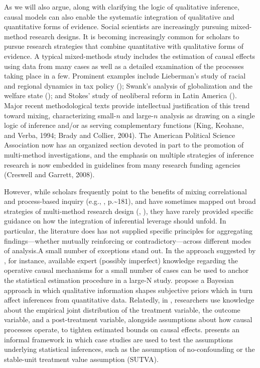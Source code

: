 \documentclass[
  12pt,
]{book}
\begin{document}
As we will also argue, along with clarifying the logic of qualitative inference, causal models can also enable the systematic integration of qualitative and quantitative forms of evidence. Social scientists are increasingly pursuing mixed-method research designs. It is becoming increasingly common for scholars to pursue research strategies that combine quantitative with qualitative forms of evidence. A typical mixed-methods study includes the estimation of causal effects using data from many cases as well as a detailed examination of the processes taking place in a few. Prominent examples include Lieberman's study of racial and regional dynamics in tax policy (\citet{lieberman2003race}); Swank's analysis of globalization and the welfare state (\citet{swank2002global}); and Stokes' study of neoliberal reform in Latin America (\citet{stokes2001mandates}). Major recent methodological texts provide intellectual justification of this trend toward mixing, characterizing small-\(n\) and large-\(n\) analysis as drawing on a single logic of inference and/or as serving complementary functions (King, Keohane, and Verba, 1994; Brady and Collier, 2004). The American Political Science Association now has an organized section devoted in part to the promotion of multi-method investigations, and the emphasis on multiple strategies of inference research is now embedded in guidelines from many research funding agencies (Creswell and Garrett, 2008).

However, while scholars frequently point to the benefits of mixing correlational and process-based inquiry (e.g., \citet{collier2010sources}, p.\textasciitilde181), and have sometimes mapped out broad strategies of multi-method research design (\citet{Lieberman2005nested}, \citet{SeawrightGerring2008}), they have rarely provided specific guidance on how the integration of inferential leverage should unfold. In particular, the literature does has not supplied specific principles for aggregating findings---whether mutually reinforcing or contradictory---across different modes of analysis.A small number of exceptions stand out. In the approach suggested by \citet{gordon2004quantitative}, for instance, available expert (possibly imperfect) knowledge regarding the operative causal mechanisms for a small number of cases can be used to anchor the statistical estimation procedure in a large-N study. \citet{WesternJackman1994} propose a Bayesian approach in which qualitative information shapes subjective priors which in turn affect inferences from quantitative data. Relatedly, in \citet{GlynnQuinn2011}, researchers use knowledge about the empirical joint distribution of the treatment variable, the outcome variable, and a post-treatment variable, alongside assumptions about how causal processes operate, to tighten estimated bounds on causal effects. \citet{seawrightbook} presents an informal framework in which case studies are used to test the assumptions underlying statistical inferences, such as the assumption of no-confounding or the stable-unit treatment value assumption (SUTVA).
\end{document}

